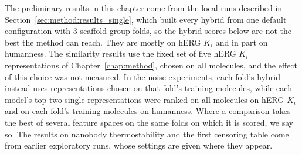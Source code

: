 

The preliminary results in this chapter come from the local runs described in Section~\ref{sec:method:results_single}, which built every hybrid from one default configuration with 3 scaffold-group folds, so the hybrid scores below are not the best the method can reach. They are mostly on hERG $K_i$ and in part on humanness. The similarity results use the fixed set of five hERG $K_i$ representations of Chapter~\ref{chap:method}, chosen on all molecules, and the effect of this choice was not measured. In the noise experiments, each fold's hybrid instead uses representations chosen on that fold's training molecules, while each model's top two single representations were ranked on all molecules on hERG $K_i$ and on each fold's training molecules on humanness. Where a comparison takes the best of several feature spaces on the same folds on which it is scored, we say so. The results on nanobody thermostability and the first censoring table come from earlier exploratory runs, whose settings are given where they appear.

